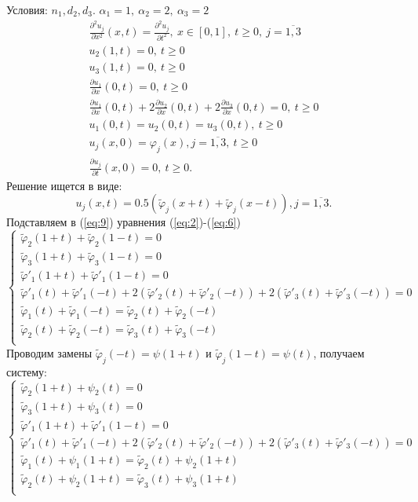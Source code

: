 \documentclass[a4paper, 12pt,fleqn]{extarticle}
\newcommand{\D}[2]{\frac{\partial #1}{\partial #2}}
\newcommand{\DQ}[2]{\frac{\partial^2 #1}{\partial #2^2}}
\begin{document}
Условия: $n_1, d_2, d_3$.
$\alpha_1=1,\ \alpha_2=2,\ \alpha_3=2$
\begin{gather}
    \DQ{u_j}{x}(x,t)=\DQ{u_j}{t},\ x\in[0,1],\ t\geq 0,\ j=\overline{1,3}\\
    u_2(1,t)=0, \ t\geq 0 \label{eq:2} \\ 
    u_3(1,t)=0,  \ t\geq 0  \\
    \D{u_1}{x}(0,t)=0, \ t\geq 0\\
    \D{u_1}{x}(0,t)+2\D{u_2}{x}(0,t)+2\D{u_3}{x}(0,t)=0, \ t\geq 0\\
    u_1(0,t)=u_2(0,t)=u_3(0,t), \ t\geq 0 \label{eq:6}\\
    u_j(x,0)=\varphi_j(x), j=\overline{1,3}, \ t\geq 0\\
    \D{u_j}{t}(x,0)=0, \ t\geq 0.
\end{gather}
Решение ищется в виде:
    \begin{equation}\label{eq:9}
        u_j(x,t)=0.5(\tilde{\varphi}_j(x+t)+\tilde{\varphi}_j(x-t)), j=\overline{1,3}.
    \end{equation}
Подставляем в (\ref{eq:9}) уравнения (\ref{eq:2})-(\ref{eq:6})
\[\begin{cases}
    \tilde{\varphi}_2(1+t)+\tilde{\varphi}_2(1-t)=0 \\
    \tilde{\varphi}_3(1+t)+\tilde{\varphi}_3(1-t)=0 \\
    \tilde{\varphi}'_1(1+t)+\tilde{\varphi}'_1(1-t)=0 \\
    \tilde{\varphi}'_1(t)+\tilde{\varphi}'_1(-t)+2(\tilde{\varphi}'_2(t)+\tilde{\varphi}'_2(-t))+2(\tilde{\varphi}'_3(t)+\tilde{\varphi}'_3(-t))=0\\
    \tilde{\varphi}_1(t)+\tilde{\varphi}_1(-t)=\tilde{\varphi}_2(t)+\tilde{\varphi}_2(-t)\\
    \tilde{\varphi}_2(t)+\tilde{\varphi}_2(-t)=\tilde{\varphi}_3(t)+\tilde{\varphi}_3(-t)\\
\end{cases}\]
Проводим замены $\tilde{\varphi}_j(-t)=\psi(1+t)$ и $\tilde{\varphi}_j(1-t)=\psi(t)$, получаем систему:
\[\begin{cases}
    \tilde{\varphi}_2(1+t)+\psi_2(t)=0\\
    \tilde{\varphi}_3(1+t)+\psi_3(t)=0\\
    \tilde{\varphi}'_1(1+t)+\tilde{\varphi}'_1(1-t)=0\\
    \tilde{\varphi}'_1(t)+\tilde{\varphi}'_1(-t)+2(\tilde{\varphi}'_2(t)+\tilde{\varphi}'_2(-t))+2(\tilde{\varphi}'_3(t)+\tilde{\varphi}'_3(-t))=0\\
    \tilde{\varphi}_1(t)+\psi_1(1+t)=\tilde{\varphi}_2(t)+\psi_2(1+t)\\
    \tilde{\varphi}_2(t)+\psi_2(1+t)=\tilde{\varphi}_3(t)+\psi_3(1+t)\\
\end{cases}\]
\end{document}

